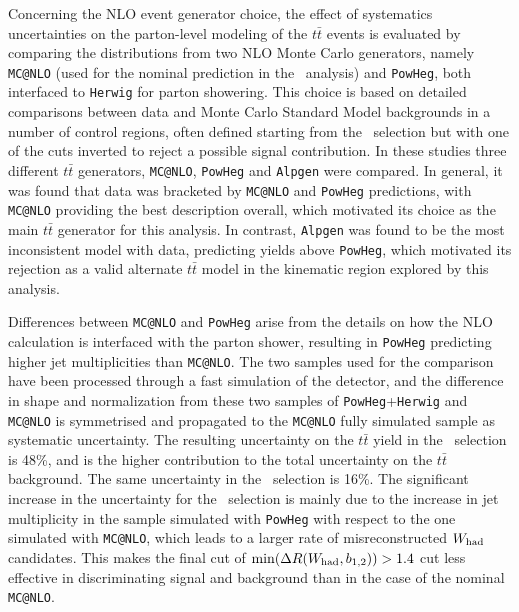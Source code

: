 Concerning the NLO event generator choice, the effect of 
systematics uncertainties on the parton-level modeling of the
$t\bar{t}$ events is evaluated by comparing the distributions from two 
NLO Monte Carlo generators, namely \texttt{MC@NLO} (used for the nominal 
prediction in the \wbx\ 
analysis) and \texttt{PowHeg}, both interfaced to \texttt{Herwig} for
parton showering.  This choice is based on detailed comparisons
between data and Monte Carlo Standard Model backgrounds in a number 
of control regions, often defined starting from the \loose\ selection 
but with one of the cuts inverted to reject a possible signal contribution. 
In these studies three different $t\bar{t}$ generators, \texttt{MC@NLO}, \texttt{PowHeg} and
\texttt{Alpgen} were compared. In general, it was found that 
data was bracketed by \texttt{MC@NLO} and \texttt{PowHeg} predictions,
with \texttt{MC@NLO} providing the best description overall, which 
motivated its choice as the main $t\bar{t}$ generator for this analysis. 
In contrast, \texttt{Alpgen} was found to be the most inconsistent 
model with data, predicting yields above \texttt{PowHeg}, which 
motivated its rejection
as a valid alternate $t\bar{t}$  model in the kinematic region 
explored by this analysis.

Differences between \texttt{MC@NLO} and \texttt{PowHeg} arise from 
the details on how the NLO calculation is interfaced with the parton 
shower, resulting in \texttt{PowHeg} predicting higher
jet multiplicities than \texttt{MC@NLO}. The two samples used for the
comparison have been processed through a fast simulation of the detector,
and the difference in shape and normalization from these two samples of
\texttt{PowHeg}+\texttt{Herwig} 
and \texttt{MC@NLO} is symmetrised and propagated to the 
\texttt{MC@NLO} fully simulated sample as systematic uncertainty. 
The resulting uncertainty on the $t\bar{t}$ yield in the \tight\ selection 
is 48\%, and is the higher contribution to the total uncertainty
on the $t\bar{t}$ background. The same uncertainty in the \loose\ selection 
is 16\%. The significant
increase in the uncertainty for the \tight\ selection 
is mainly due to the increase in jet multiplicity in the
sample simulated with \texttt{PowHeg} with respect to the
one simulated with \texttt{MC@NLO}, 
which leads to a larger rate of misreconstructed $W_{\rm had}$ 
candidates. This makes the final cut of 
$\min(\Delta R(W_{\rm had}, b_{1,2}))>1.4$ cut less 
effective in discriminating signal and background than in the 
case of the nominal \texttt{MC@NLO}.

